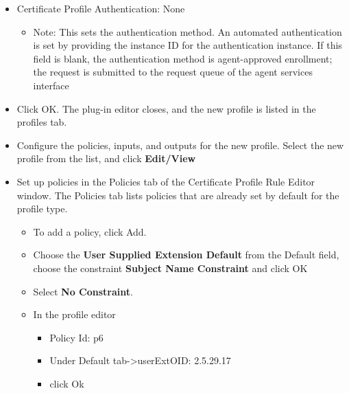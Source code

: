 \documentclass[a4paper]{article}
\begin{document}
\begin{enumerate}[label*=\arabic*.]
\begin{enumerate}[label*=\arabic*.]
\begin{itemize}
                        \item Certificate Profile Authentication: None 
                            \begin{itemize}
                                \item Note: This sets the authentication method. An automated authentication is set by providing the 
                                instance ID for the authentication instance. If this field is blank, the authentication method 
                                is agent-approved enrollment; the request is submitted to the request queue of the agent services 
                                interface
                            \end{itemize}
                        \item Click OK. The plug-in editor closes, and the new profile is listed in the profiles tab.
                        \item Configure the policies, inputs, and outputs for the new profile. Select the new profile from the list,
                            and click \textbf{Edit/View}
                        \item Set up policies in the Policies tab of the Certificate Profile Rule Editor window.
                            The Policies tab lists policies that are already set by default for the profile type.
                                \begin{itemize}
                                    \item To add a policy, click Add.
                                    \item Choose the \textbf{User Supplied Extension Default}  from the Default field, 
                                        choose the constraint \textbf{Subject Name Constraint} and click OK
                                    \item Select \textbf{No Constraint}.
                                    \item In the profile editor 
                                        \begin{itemize}
                                            \item Policy Id: p6
                                            \item Under Default tab->userExtOID: 2.5.29.17
                                            \item click Ok
                                        \end{itemize}

\end{itemize}
\end{itemize}
\end{enumerate}
\end{enumerate}
\end{document}

